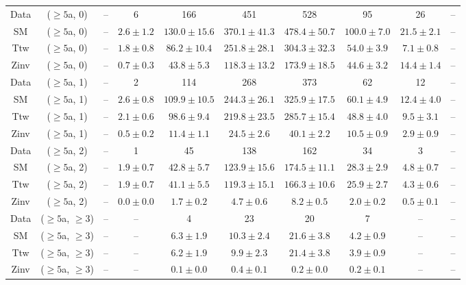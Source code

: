 \begin{table}[h!]
{\begin{tabular}{cccccccccc}
	Data & ($\ge5$a, 0) & -- & 6 & 166 & 451 & 528 & 95 & 26 & -- \\[0.5ex] 
	SM & ($\ge5$a, 0) & -- & $2.6\pm 1.2$ & $130.0\pm 15.6$ & $370.1\pm 41.3$ & $478.4\pm 50.7$ & $100.0\pm 7.0$ & $21.5\pm 2.1$ & -- \\[0.5ex] 
	Ttw & ($\ge5$a, 0) & -- & $1.8\pm 0.8$ & $86.2\pm 10.4$ & $251.8\pm 28.1$ & $304.3\pm 32.3$ & $54.0\pm 3.9$ & $7.1\pm 0.8$ & -- \\[0.5ex] 
	Zinv & ($\ge5$a, 0) & -- & $0.7\pm 0.3$ & $43.8\pm 5.3$ & $118.3\pm 13.2$ & $173.9\pm 18.5$ & $44.6\pm 3.2$ & $14.4\pm 1.4$ & -- \\[0.5ex] 
	Data & ($\ge5$a, 1) & -- & 2 & 114 & 268 & 373 & 62 & 12 & -- \\[0.5ex] 
	SM & ($\ge5$a, 1) & -- & $2.6\pm 0.8$ & $109.9\pm 10.5$ & $244.3\pm 26.1$ & $325.9\pm 17.5$ & $60.1\pm 4.9$ & $12.4\pm 4.0$ & -- \\[0.5ex] 
	Ttw & ($\ge5$a, 1) & -- & $2.1\pm 0.6$ & $98.6\pm 9.4$ & $219.8\pm 23.5$ & $285.7\pm 15.4$ & $48.8\pm 4.0$ & $9.5\pm 3.1$ & -- \\[0.5ex] 
	Zinv & ($\ge5$a, 1) & -- & $0.5\pm 0.2$ & $11.4\pm 1.1$ & $24.5\pm 2.6$ & $40.1\pm 2.2$ & $10.5\pm 0.9$ & $2.9\pm 0.9$ & -- \\[0.5ex] 
	Data & ($\ge5$a, 2) & -- & 1 & 45 & 138 & 162 & 34 & 3 & -- \\[0.5ex] 
	SM & ($\ge5$a, 2) & -- & $1.9\pm 0.7$ & $42.8\pm 5.7$ & $123.9\pm 15.6$ & $174.5\pm 11.1$ & $28.3\pm 2.9$ & $4.8\pm 0.7$ & -- \\[0.5ex] 
	Ttw & ($\ge5$a, 2) & -- & $1.9\pm 0.7$ & $41.1\pm 5.5$ & $119.3\pm 15.1$ & $166.3\pm 10.6$ & $25.9\pm 2.7$ & $4.3\pm 0.6$ & -- \\[0.5ex] 
	Zinv & ($\ge5$a, 2) & -- & $0.0\pm 0.0$ & $1.7\pm 0.2$ & $4.7\pm 0.6$ & $8.2\pm 0.5$ & $2.0\pm 0.2$ & $0.5\pm 0.1$ & -- \\[0.5ex] 
	Data & ($\ge5$a, $\ge3$) & -- & -- & 4 & 23 & 20 & 7 & -- & -- \\[0.5ex] 
	SM & ($\ge5$a, $\ge3$) & -- & -- & $6.3\pm 1.9$ & $10.3\pm 2.4$ & $21.6\pm 3.8$ & $4.2\pm 0.9$ & -- & -- \\[0.5ex] 
	Ttw & ($\ge5$a, $\ge3$) & -- & -- & $6.2\pm 1.9$ & $9.9\pm 2.3$ & $21.4\pm 3.8$ & $3.9\pm 0.9$ & -- & -- \\[0.5ex] 
	Zinv & ($\ge5$a, $\ge3$) & -- & -- & $0.1\pm 0.0$ & $0.4\pm 0.1$ & $0.2\pm 0.0$ & $0.2\pm 0.1$ & -- & -- \\[0.5ex] 
	\hline
	\hline
\end{tabular}}
\end{table}
